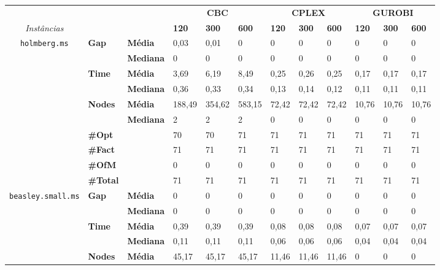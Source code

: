 \begin{table}[]
	\begin{adjustbox}{angle=90}
	\begin{tabular}{cll|lll|lll|lll}
	& & & \multicolumn{3}{c}{\textbf{CBC}} & \multicolumn{3}{c}{\textbf{CPLEX}} & \multicolumn{3}{c}{\textbf{GUROBI}} 	\\\textit{Instâncias} & & & \textbf{120} & \textbf{300} & \textbf{600} & \textbf{120} & \textbf{300} & \textbf{600} & \textbf{120} & \textbf{300} & \textbf{600} \\
\hline
\multirow{7}{*}{\texttt{holmberg.ms}} & \multirow{2}{*}{\textbf{Gap}} & \textbf{Média} & 0,03 & 0,01 & 0 & 0 & 0 & 0 & 0 & 0 & 0 \\
 & & \textbf{Mediana} & 0 & 0 & 0 & 0 & 0 & 0 & 0 & 0 & 0 \\
\cline{2-12}
 & \multirow{2}{*}{\textbf{Time}} & \textbf{Média} & 3,69 & 6,19 & 8,49 & 0,25 & 0,26 & 0,25 & 0,17 & 0,17 & 0,17 \\
 & & \textbf{Mediana} & 0,36 & 0,33 & 0,34 & 0,13 & 0,14 & 0,12 & 0,11 & 0,11 & 0,11 \\
\cline{2-12}
 & \multirow{2}{*}{\textbf{Nodes}} & \textbf{Média} & 188,49 & 354,62 & 583,15 & 72,42 & 72,42 & 72,42 & 10,76 & 10,76 & 10,76 \\
 & & \textbf{Mediana} & 2 & 2 & 2 & 0 & 0 & 0 & 0 & 0 & 0 \\
\cline{2-12}
 & \textbf{\#Opt} & & 70 & 70 & 71 & 71 & 71 & 71 & 71 & 71 & 71 \\
 & \textbf{\#Fact} & & 71 & 71 & 71 & 71 & 71 & 71 & 71 & 71 & 71 \\
 & \textbf{\#OfM} & & 0 & 0 & 0 & 0 & 0 & 0 & 0 & 0 & 0 \\
 & \textbf{\#Total} & & 71 & 71 & 71 & 71 & 71 & 71 & 71 & 71 & 71 \\
\hline
\multirow{7}{*}{\texttt{beasley.small.ms}} & \multirow{2}{*}{\textbf{Gap}} & \textbf{Média} & 0 & 0 & 0 & 0 & 0 & 0 & 0 & 0 & 0 \\
 & & \textbf{Mediana} & 0 & 0 & 0 & 0 & 0 & 0 & 0 & 0 & 0 \\
\cline{2-12}
 & \multirow{2}{*}{\textbf{Time}} & \textbf{Média} & 0,39 & 0,39 & 0,39 & 0,08 & 0,08 & 0,08 & 0,07 & 0,07 & 0,07 \\
 & & \textbf{Mediana} & 0,11 & 0,11 & 0,11 & 0,06 & 0,06 & 0,06 & 0,04 & 0,04 & 0,04 \\
\cline{2-12}
 & \multirow{2}{*}{\textbf{Nodes}} & \textbf{Média} & 45,17 & 45,17 & 45,17 & 11,46 & 11,46 & 11,46 & 0 & 0 & 0 \\

\end{tabular}
\end{adjustbox}
\end{table}
